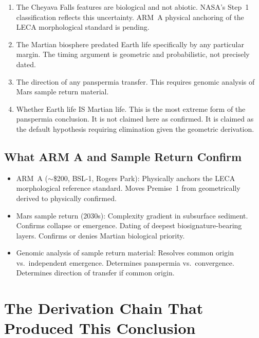\documentclass[11pt, a4paper]{article}
\begin{document}
\begin{enumerate}[leftmargin=*, label=(\arabic*)]
\item The Cheyava Falls features are
  biological and not abiotic.
  NASA's Step~1 classification reflects
  this uncertainty.
  ARM~A physical anchoring of the LECA
  morphological standard is pending.

\item The Martian biosphere predated
  Earth life specifically by any
  particular margin.
  The timing argument is geometric
  and probabilistic, not precisely dated.

\item The direction of any panspermia
  transfer.
  This requires genomic analysis of
  Mars sample return material.

\item Whether Earth life IS Martian life.
  This is the most extreme form of the
  panspermia conclusion.
  It is not claimed here as confirmed.
  It is claimed as the default hypothesis
  requiring elimination given the
  geometric derivation.
\end{enumerate}

\subsection{What ARM A and Sample Return
Confirm}

\begin{itemize}[leftmargin=*]
\item ARM~A ($\sim$\$200, BSL-1, Rogers Park):
  Physically anchors the LECA morphological
  reference standard.
  Moves Premise~1 from geometrically derived
  to physically confirmed.

\item Mars sample return (2030s):
  Complexity gradient in subsurface sediment.
  Confirms collapse or emergence.
  Dating of deepest biosignature-bearing layers.
  Confirms or denies Martian biological priority.

\item Genomic analysis of sample return material:
  Resolves common origin vs.\ independent emergence.
  Determines panspermia vs.\ convergence.
  Determines direction of transfer if common origin.
\end{itemize}

\section{The Derivation Chain That Produced
This Conclusion}
\end{document}
